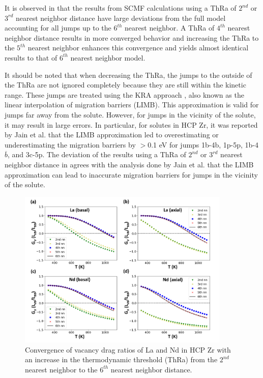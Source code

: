 \documentclass[preprint,12pt]{elsarticle}
\begin{document}
It is observed in  that the results from SCMF calculations using a ThRa of $2^{nd}$ or $3^{rd}$ nearest neighbor distance have large deviations from the full model accounting for all jumps up to the $6^{th}$ nearest neighbor. A ThRa of $4^{th}$ nearest neighbor distance results in more converged behavior and increasing the ThRa to the $5^{th}$ nearest neighbor enhances this convergence and yields almost identical results to that of $6^{th}$ nearest neighbor model.

It should be noted that when decreasing the ThRa, the jumps to the outside of the ThRa are not ignored completely because they are still within the kinetic range. These jumps are treated using the KRA approach \cite{van_der_ven_first_2005}, also known as the linear interpolation of migration barriers (LIMB). This approximation is valid for jumps far away from the solute. However, for jumps in the vicinity of the solute, it may result in large errors. In particular, for solutes in HCP Zr, it was reported by Jain et al.\cite{jain_first-principles_2019} that the LIMB approximation led to overestimating or underestimating the migration barriers by $>$0.1 eV for jumps 1b-4b, 1p-5p, 1b-4$\overline{b}$, and 3c-5p. The deviation of the results using a ThRa of $2^{nd}$ or $3^{rd}$ nearest neighbor distance in  agrees with the analysis done by Jain et al. that the LIMB approximation can lead to inaccurate migration barriers for jumps in the vicinity of the solute.

\begin{figure}[h!]
    \centering
    \includegraphics[width=0.9\textwidth]{10_nn_convergence.jpg}
    \caption{Convergence of vacancy drag ratios of La and Nd in HCP Zr with an increase in the thermodynamic threshold (ThRa) from the $2^{nd}$ nearest neighbor to the $6^{th}$ nearest neighbor distance.}
    \label{fig:convergence_nn}
\end{figure}
\end{document}
